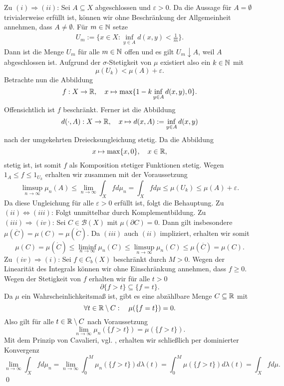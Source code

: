 \begin{proof*}
    Zu $(i) \Rightarrow (ii)$: Sei $A \subseteq X$ abgeschlossen und $\varepsilon > 0$. Da die Aussage für $A = \emptyset$ trivialerweise erfüllt ist,
    können wir ohne Beschränkung der Allgemeinheit annehmen, dass $A \neq \emptyset$. Für $m \in \mathbb{N}$ setze
    \begin{align*}
        U_m := \{x \in X: \inf_{y \in A}d(x,y) < \frac{1}{m}\}.
    \end{align*}
    Dann ist die Menge $U_m$ für alle $m \in \mathbb{N}$ offen und es gilt $U_m \downarrow A$, weil $A$ abgeschlossen ist.  
    Aufgrund der $\sigma$-Stetigkeit von $\mu$ existiert also ein $k \in \mathbb{N}$ mit 
    $$
        \mu(U_k) < \mu(A) + \varepsilon . 
    $$
    Betrachte nun die Abbildung 
    $$
        f:X \to \mathbb{R}, \quad x \mapsto \max\{1 - k \inf_{y \in A}d(x,y), 0\}.
    $$
    Offensichtlich ist $f$ beschränkt. Ferner ist die Abbildung 
    $$
        d(\cdot, A): X \to \mathbb{R}, \quad x \mapsto d(x,A) := \inf_{y \in A}d(x,y)
    $$
    nach der umgekehrten Dreiecksungleichung stetig. Da die Abbildung
    $$
        x \mapsto \max\{x,0\}, \quad x \in \mathbb{R},
    $$
    stetig ist, ist somit $f$ als Komposition stetiger Funktionen stetig. 
    Wegen $1_A \leq f \leq 1_{U_k}$ erhalten wir zusammen mit der Voraussetzung 
    $$
    \limsup_{n \to \infty} \mu_n(A) \leq \lim_{n \to \infty} \int_X fd\mu_n = \int_X fd\mu \leq \mu(U_k) \leq \mu(A) + \varepsilon.
    $$
    Da diese Ungleichung für alle $\varepsilon > 0$ erfüllt ist, folgt die Behauptung. 
    \newline 
    Zu $(ii) \iff (iii)$: Folgt unmittelbar durch Komplementbildung. 
    \newline
    Zu $(iii) \Rightarrow (iv)$: 
    Sei $C \in \mathcal{B}(X)$ mit $\mu(\partial C) = 0$. Dann gilt insbesondere $\mu(\overline{C}) = \mu(C) = \mu(\mathring{C})$. Da $(iii)$ auch $(ii)$ impliziert, erhalten wir somit
    $$
        \mu(C) = \mu(\mathring{C}) \leq \liminf_{n \to \infty} \mu_n(C) \leq \limsup_{n \to \infty} \mu_n(C) \leq \mu(\overline{C}) = \mu(C).
    $$
    \newline 
    Zu $(iv) \Rightarrow (i)$: 
    Sei $f \in C_b(X)$ beschränkt durch $M > 0$. Wegen der Linearität des Integrals können wir ohne Einschränkung annehmen, dass $f \geq 0$. 
    Wegen der Stetigkeit von $f$ erhalten wir für alle $t > 0$
    $$
        \partial\{ f > t \} \subseteq \{f = t \}. 
    $$
    Da $\mu$ ein Wahrscheinlichkeitsmaß ist, gibt es eine abzählbare Menge $C \subseteq \mathbb{R}$ mit 
    $$
        \forall t \in \mathbb{R} \setminus C: \quad \mu(\{f = t \}) = 0. 
    $$
    Also gilt für alle $t \in \mathbb{R} \setminus C$ nach Voraussetzung 
    $$
        \lim_{n \to \infty} \mu_n(\{f > t \}) = \mu(\{f > t \}).
    $$
    Mit dem Prinzip von Cavalieri, vgl. \cite[Satz 1.8.20]{gs}, erhalten wir schließlich per dominierter Konvergenz
    $$
        \lim_{n \to \infty} \int_X fd\mu_n = \lim_{n \to \infty} \int_0^M \mu_n(\{f > t \})d\lambda(t) = \int_0^M \mu(\{f > t \}) d\lambda(t) = \int_Xfd\mu. 
    $$
    \qed 
\end{proof*}